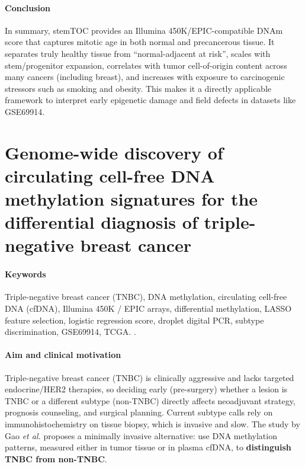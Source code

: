 \documentclass[10pt]{extarticle}
\begin{document}
\paragraph{Conclusion}
In summary, stemTOC provides an Illumina 450K/EPIC-compatible DNAm score that captures mitotic age in both normal and precancerous tissue. It separates truly healthy tissue from ``normal-adjacent at risk'', scales with stem/progenitor expansion, correlates with tumor cell-of-origin content across many cancers (including breast), and increases with exposure to carcinogenic stressors such as smoking and obesity. This makes it a directly applicable framework to interpret early epigenetic damage and field defects in datasets like GSE69914.


\section{Genome-wide discovery of circulating cell-free DNA methylation signatures for the differential diagnosis of triple-negative breast cancer}

\paragraph{Keywords}
Triple-negative breast cancer (TNBC), DNA methylation, circulating cell-free DNA (cfDNA), Illumina 450K / EPIC arrays, differential methylation, LASSO feature selection, logistic regression score, droplet digital PCR, subtype discrimination, GSE69914, TCGA. \cite{gao2025cfdna}.
\paragraph{Aim and clinical motivation}
Triple-negative breast cancer (TNBC) is clinically aggressive and lacks targeted endocrine/HER2 therapies, so deciding early (pre-surgery) whether a lesion is TNBC or a different subtype (non-TNBC) directly affects neoadjuvant strategy, prognosis counseling, and surgical planning. Current subtype calls rely on immunohistochemistry on tissue biopsy, which is invasive and slow. The study by Gao \textit{et al.} proposes a minimally invasive alternative: use DNA methylation patterns, measured either in tumor tissue or in plasma cfDNA, to \textbf{distinguish TNBC from non-TNBC}. 
\end{document}
